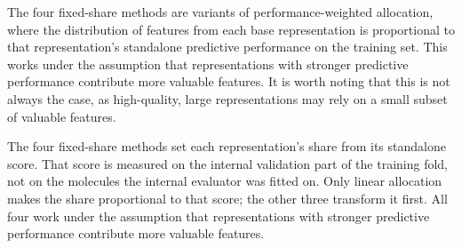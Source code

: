 


The four fixed-share methods are variants of performance-weighted allocation, where the distribution of features from each base representation is proportional to that representation's standalone predictive performance on the training set. This works under the assumption that representations with stronger predictive performance contribute more valuable features. It is worth noting that this is not always the case, as high-quality, large representations may rely on a small subset of valuable features.

The four fixed-share methods set each representation's share from its standalone score. That score is measured on the internal validation part of the training fold, not on the molecules the internal evaluator was fitted on. Only linear allocation makes the share proportional to that score; the other three transform it first. All four work under the assumption that representations with stronger predictive performance contribute more valuable features.

